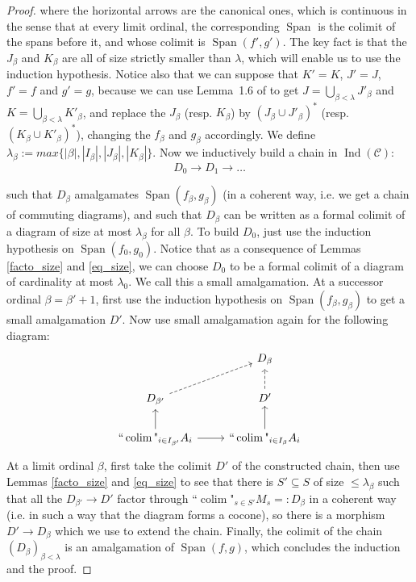 \documentclass{article}
\newcommand{\fcolim}{\text{``}\colim\text{"}}
\newcommand{\Ind}{\operatorname{Ind}}
\newcommand{\Span}{\operatorname{Span}}
\newcommand{\colim}{\operatorname{colim}}
\begin{document}
\begin{proof}
where the horizontal arrows are the canonical ones, which is continuous in the sense that at every limit ordinal, the corresponding $\Span$ is the colimit of the spans before it, and whose colimit is $\Span(f',g')$. The key fact is that the $J_\beta$ and $K_\beta$ are all of size strictly smaller than $\lambda$, which will enable us to use the induction hypothesis. Notice also that we can suppose that $K'=K$, $J'=J$, $f'=f$ and $g'=g$, because we can use Lemma~1.6 of \cite{rosicky1994locally} to get $J=\bigcup_{\beta<\lambda}J'_\beta$ and $K=\bigcup_{\beta<\lambda}K'_\beta$, and replace the $J_\beta$ (resp. $K_\beta$) by $(J_\beta\cup J'_\beta)^*$ (resp. $(K_\beta\cup K'_\beta)^*$), changing the $f_\beta$ and $g_\beta$ accordingly. We define $\lambda_\beta:=max\{|\beta|,|I_\beta|,|J_\beta|,|K_\beta|\}$. Now we inductively build a chain in $\Ind(\mathcal{C})$:
$$D_0\xrightarrow{}D_1\xrightarrow{}\dots$$

such that $D_\beta$ amalgamates $\Span(f_\beta,g_\beta)$ (in a coherent way, i.e. we get a chain of commuting diagrams), and such that $D_\beta$ can be written as a formal colimit of a diagram of size at most $\lambda_\beta$ for all $\beta$. To build $D_0$, just use the induction hypothesis on $\Span(f_0,g_0)$. Notice that as a consequence of Lemmas \ref{facto_size} and \ref{eq_size}, we can choose $D_0$ to be a formal colimit of a diagram of cardinality at most $\lambda_0$. We call this a small amalgamation. At a successor ordinal $\beta=\beta'+1$, first use the induction hypothesis on $\Span(f_\beta,g_\beta)$ to get a small amalgamation $D'$. Now use small amalgamation again for the following diagram:
\[\begin{tikzcd}
	& {D_\beta} \\
	{D_{\beta'}} & {D'} \\
	{\fcolim_{i\in I_{\beta'}}A_i} & {\fcolim_{i\in I_\beta}A_i}
	\arrow[dashed, from=2-1, to=1-2]
	\arrow[dashed, from=2-2, to=1-2]
	\arrow[from=3-1, to=2-1]
	\arrow[from=3-1, to=3-2]
	\arrow[from=3-2, to=2-2]
\end{tikzcd}\]
At a limit ordinal $\beta$, first take the colimit $D'$ of the constructed chain, then use Lemmas \ref{facto_size} and \ref{eq_size} to see that there is $S'\subseteq S$ of size $\leq\lambda_\beta$ such that all the $D_{\beta'}\xrightarrow{}D'$ factor through $\fcolim_{s\in S'}M_s=:D_\beta$ in a coherent way (i.e. in such a way that the diagram forms a cocone), so there is a morphism $D'\xrightarrow{}D_\beta$ which we use to extend the chain. Finally, the colimit of the chain $(D_\beta)_{\beta<\lambda}$ is an amalgamation of $\Span(f,g)$, which concludes the induction and the proof.
\end{proof}
\end{document}
